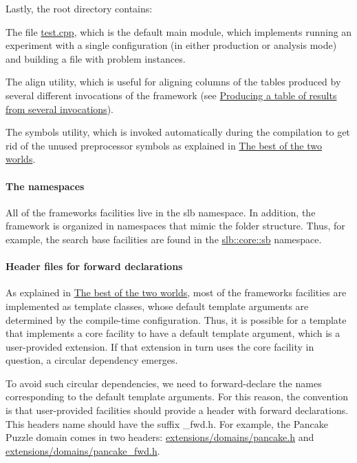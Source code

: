 Lastly, the root directory contains\+:
\begin{DoxyItemize}
\item The file \hyperlink{test_8cpp}{test.\+cpp}, which is the default main module, which implements running an experiment with a single configuration (in either production or analysis mode) and building a file with problem instances.
\item The {\ttfamily align} utility, which is useful for aligning columns of the tables produced by several different invocations of the framework (see \hyperlink{index_s-single}{Producing a table of results from several invocations}).
\item The {\ttfamily symbols} utility, which is invoked automatically during the compilation to get rid of the unused preprocessor symbols as explained in \hyperlink{index_s-configuration}{The best of the two worlds}.
\end{DoxyItemize}\hypertarget{index_s-namespace}{}\paragraph{The namespaces}\label{index_s-namespace}
All of the framework\textquotesingle{}s facilities live in the {\ttfamily slb} namespace. In addition, the framework is organized in namespaces that mimic the folder structure. Thus, for example, the search base facilities are found in the \hyperlink{namespaceslb_1_1core_1_1sb}{slb\+::core\+::sb} namespace.\hypertarget{index_s-forward}{}\paragraph{Header files for forward declarations}\label{index_s-forward}
As explained in \hyperlink{index_s-configuration}{The best of the two worlds}, most of the framework\textquotesingle{}s facilities are implemented as template classes, whose default template arguments are determined by the compile-\/time configuration. Thus, it is possible for a template that implements a core facility to have a default template argument, which is a user-\/provided extension. If that extension in turn uses the core facility in question, a circular dependency emerges.

To avoid such circular dependencies, we need to forward-\/declare the names corresponding to the default template arguments. For this reason, the convention is that user-\/provided facilities should provide a header with forward declarations. This header\textquotesingle{}s name should have the suffix {\ttfamily \+\_\+fwd.\+h}. For example, the Pancake Puzzle domain comes in two headers\+: {\ttfamily \hyperlink{pancake_8h}{extensions/domains/pancake.\+h}} and {\ttfamily \hyperlink{pancake__fwd_8h}{extensions/domains/pancake\+\_\+fwd.\+h}}.

